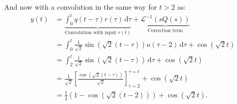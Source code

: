 And now with a convolution in the same way for $t > 2$ as:
\begin{align*}
  y(t) &= \underbrace{\int_{0}^{t} q \left( t-\tau \right) r(\tau) \, \mathrm{d}\tau}_{\text{Convolution with input } r(t)} + \underbrace{\mathcal{L}^{-1}\left( sQ(s) \right) }_{\text{Correction term}} \\
  &= \int_{0}^{t} \frac{1}{\sqrt{2}} \sin \left( \sqrt{2}\left( t-\tau \right) \right) u \left( \tau - 2 \right) \, \mathrm{d}\tau + \cos \left( \sqrt{2}t \right) \\
  &= \int_{2}^{t} \frac{1}{\sqrt{2}} \sin \left( \sqrt{2} \left( t - \tau \right)  \right) \, \mathrm{d}\tau + \cos \left( \sqrt{2}t \right)  \\
  &= \frac{1}{\sqrt{2}}\left[ \frac{\cos \left( \sqrt{2}\left( t-\tau \right)  \right) }{\sqrt{2}} \right]_{\tau = 2}^{\tau = t} + \cos \left( \sqrt{2}t \right)  \\
  &= \frac{1}{2} \left( 1 - \cos \left( \sqrt{2} \left( t-2 \right)  \right)  \right) + \cos \left( \sqrt{2}t \right)
.\end{align*}
